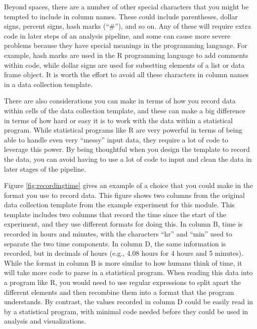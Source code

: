 \documentclass[]{tufte-book}
\begin{document}
Beyond spaces, there are a number of other special characters that you might
be tempted to include in column names. These could include parentheses, dollar signs,
percent signs, hash marks (``\#''), and so on. Any of these will require extra code
in later steps of an analysis pipeline, and some can cause more severe problems
because they have special meanings in the programming language. For example,
hash marks are used in the R programming language to add comments within code, while
dollar signs are used for subsetting elements of a list or data frame object.
It is worth the effort to avoid all these characters in column names in a data
collection template.

There are also considerations you can make in terms of how you record data within
cells of the data collection template, and these can make a big difference in terms
of how hard or easy it is to work with the data within a statistical program. While
statistical programs like R are very powerful in terms of being able to handle even
very ``messy'' input data, they require a lot of code to leverage this power. By being
thoughtful when you design the template to record the data, you can avoid having to
use a lot of code to input and clean the data in later stages of the pipeline.

Figure \ref{fig:recordingtime} gives an example of a choice that you could make
in the format you use to record data. This figure shows two columns from the
original data collection template from the example experiment for this module.
This template includes two columns that record the time since the start of the
experiment, and they use different formats for doing this. In column B, time is
recorded in hours and minutes, with the characters ``hr'' and ``min'' used to
separate the two time components. In column D, the same information is recorded,
but in decimals of hours (e.g., 4.08 hours for 4 hours and 5 minutes). While the
format in column B is more similar to how humans think of time, it will take
more code to parse in a statistical program. When reading this data into a
program like R, you would need to use regular expressions to split apart the
different elements and then recombine them into a format that the program
understands. By contrast, the values recorded in column D could be easily read
in by a statistical program, with minimal code needed before they could be used
in analysis and visualizations.
\end{document}
